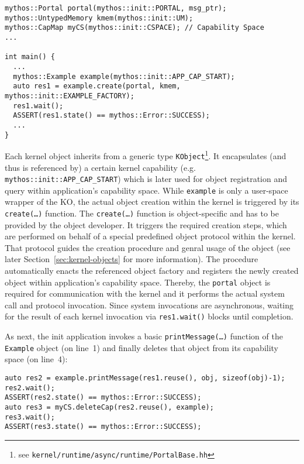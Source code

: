 \lstset{language=c++}
\begin{lstlisting}
mythos::Portal portal(mythos::init::PORTAL, msg_ptr);
mythos::UntypedMemory kmem(mythos::init::UM);
mythos::CapMap myCS(mythos::init::CSPACE); // Capability Space
...

int main() {
  ...
  mythos::Example example(mythos::init::APP_CAP_START);
  auto res1 = example.create(portal, kmem, mythos::init::EXAMPLE_FACTORY);
  res1.wait();
  ASSERT(res1.state() == mythos::Error::SUCCESS);
  ...   
}
\end{lstlisting}

\noindent Each kernel object inherits from a generic type
\texttt{KObject}\footnote{see
\texttt{kernel/runtime/async/runtime/PortalBase.hh}}.
It encapsulates (and thus is referenced by) a certain kernel capability (e.g.
\texttt{mythos::init::APP\_CAP\_START}) which is later used for object
registration and query within application's capability space. While
\texttt{example} is only a user-space wrapper of the KO, the actual object
creation within the kernel is triggered by its \texttt{create(\ldots)} function.
The \texttt{create(\ldots)} function is object-specific and has to be provided
by the object developer. It triggers the required creation steps, which are
performed on behalf of a special predefined object protocol within the kernel.
That protocol guides the creation procedure and genral usage of the object (see
later Section~\ref{sec:kernel-objects} for more information). The procedure
automatically enacts the referenced object factory and registers the newly
created object within application's capability space.
Thereby, the \texttt{portal} object is required for communication with the
kernel and it performs the actual system call and protocol invocation. Since
system invocations are asynchronous, waiting for the result of each kernel
invocation via \texttt{res1.wait()} blocks until completion.

As next, the init application invokes a basic \texttt{printMessage(\ldots)}
function of the \texttt{Example} object (on line~1) and finally deletes that
object from its capability space (on line~4):

\lstset{language=c++}
\begin{lstlisting}
auto res2 = example.printMessage(res1.reuse(), obj, sizeof(obj)-1);
res2.wait();
ASSERT(res2.state() == mythos::Error::SUCCESS);
auto res3 = myCS.deleteCap(res2.reuse(), example);
res3.wait();
ASSERT(res3.state() == mythos::Error::SUCCESS);
\end{lstlisting}

